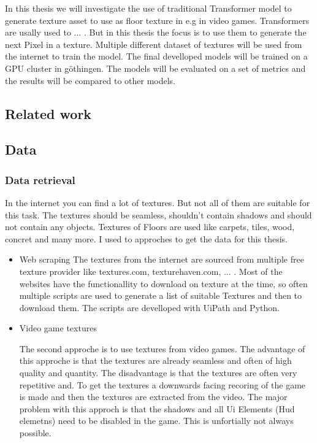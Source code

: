 
In this thesis we will investigate the use of traditional Transformer model to generate texture asset to use as floor texture in e.g in video games. Transformers are usally used to ... . But in this thesis the focus is to use them to generate the next Pixel in a texture. Multiple different dataset of textures will be used from the internet to train the model. The final develloped models will be trained on a GPU cluster in göthingen. The models will be evaluated on a set of metrics and the results will be compared to other models.

\subsection{Related work}
    
\subsection{Data}
    
    \subsubsection{Data retrieval}
        In the internet you can find a lot of textures. But not all of them are suitable for this task. The textures should be seamless, shouldn't contain shadows and should not contain any objects. Textures of Floors are used like carpets, tiles, wood, concret and many more. I used to approches to get the data for this thesis.
        
        \begin{itemize}
            \item Web scraping
            The textures from the internet are sourced from multiple free texture provider like textures.com, texturehaven.com, ... . Most of the websites have the functionallity to download on texture at the time, so often multiple scripts are used to generate a list of suitable Textures and then to download them. The scripts are develloped with UiPath and Python. 
            
            \item Video game textures
            
            The second approche is to use textures from video games. The advantage of this approche is that the textures are already seamless and often of high quality and quantity. The disadvantage is that the textures are often very repetitive and. To get the textures a downwards facing recoring of the game is made and then the textures are extracted from the video. The major problem with this approch is that the shadows and all Ui Elements (Hud elemetns) need to be disabled in the game. This is unfortially not always possible.

        \end{itemize}

